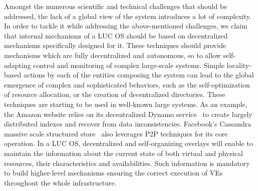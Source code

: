 Amongst the numerous scientific and technical challenges that should be addressed, 
the lack of a global view of the system introduces a lot
of complexity. In order to tackle it while addressing the above-mentioned
challenges, we claim that internal mechanisms of a LUC OS should be based
on decentralized mechanisms specifically designed for it.
These techniques should provide mechanisms which are fully decentralized and
autonomous, so to allow self-adapting control and monitoring of complex
large-scale systems. Simple locality-based actions by each of the entities
composing the system can lead to the global emergence of complex and
sophisticated behaviors, such as the self-optimization of resource allocation,
or the creation of decentralized directories. These techniques are starting to
be used in well-known large systems. As an example, the Amazon website relies on
its decentralized Dynamo service~\cite{decandia:2007} to create largely distributed indexes and recover from data
inconsistencies. Facebook’s Cassandra massive scale structured
store~\cite{lakshman:2010} also leverages P2P techniques for its core
operation.
%
In a LUC OS, decentralized and self-organizing overlays will enable to maintain
the information about
the current state of both virtual and physical resources, their characteristics and
availabilities. Such information is mandatory to build higher-level mechanisms ensuring the correct execution of VEs throughout 
the whole infrastructure. 
 

